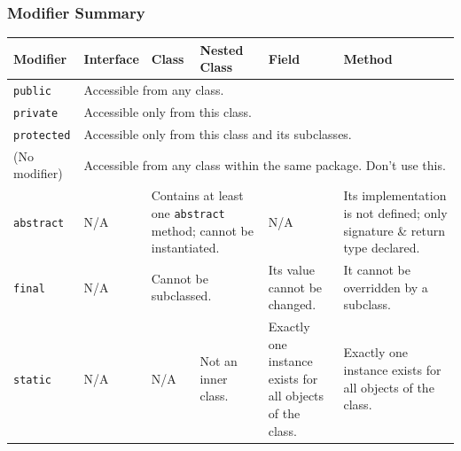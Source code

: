 \begin{frame}
\frametitle{Modifier Summary}

{\tiny
\begin{center}
\begin{tabular}{|p{1.5cm}|p{1cm}|p{1cm}|p{1cm}|p{1cm}|p{2cm}|}
\hline
\textbf{Modifier} & \textbf{Interface} & \textbf{Class} & \textbf{Nested Class} & \textbf{Field} & \textbf{Method} \\
\hline
\texttt{public} & \multicolumn{5}{l|}{Accessible from any class.}\\
\hline
\texttt{private} & \multicolumn{5}{l|}{Accessible only from this class.}\\
\hline
\texttt{protected} & \multicolumn{5}{l|}{Accessible only from this class and its subclasses.}\\
\hline
(No modifier) & \multicolumn{5}{l|}{Accessible from any class within the same package. Don't use this.}\\
\hline
\hline
\texttt{abstract} & N/A & \multicolumn{2}{p{4cm}|}{Contains at least one \texttt{abstract} method; cannot be instantiated.} & N/A & Its implementation is not defined; only signature \& return type declared.\\
\hline
\texttt{final} & N/A & \multicolumn{2}{l|}{Cannot be subclassed.} & Its value cannot be changed. & It cannot be overridden by a subclass. \\
\hline
\texttt{static} & N/A & N/A & Not an inner class. & Exactly one instance exists for all objects of the class. & Exactly one instance exists for all objects of the class. \\
\hline

\end{tabular}
\end{center}
}

\end{frame}



